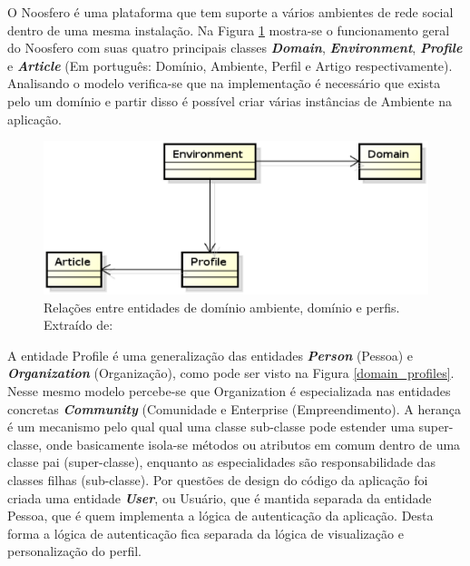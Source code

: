 
O Noosfero é uma plataforma que tem suporte a vários ambientes de rede social dentro de uma mesma instalação. Na Figura \ref{domain_main} mostra-se o funcionamento geral do Noosfero com suas quatro principais classes \textbf{\textit{Domain}}, \textbf{\textit{Environment}}, \textbf{\textit{Profile}} e \textbf{\textit{Article}} (Em português: Domínio, Ambiente, Perfil e Artigo respectivamente). Analisando o modelo verifica-se que na implementação é necessário que exista pelo um domínio e partir disso é possível criar várias instâncias de Ambiente na aplicação.

\begin{figure}[h]
    \centering
    \includegraphics[keepaspectratio=true,scale=0.65]
      {figuras/domain_main.eps}
    \caption{Relações entre entidades de domínio ambiente, domínio e perfis. Extraído de: \cite{bucher2013rede}}
    \label{domain_main}
\end{figure}

A entidade Profile é uma generalização das entidades \textbf{\textit{Person}} (Pessoa) e \textbf{\textit{Organization}} (Organização), como pode ser visto na Figura \ref{domain_profiles}. Nesse mesmo modelo percebe-se que Organization é especializada nas entidades concretas \textbf{\textit{Community}} (Comunidade e Enterprise (Empreendimento). A herança é um mecanismo pelo qual qual uma classe sub-classe pode estender uma super-classe, onde basicamente isola-se métodos ou atributos em comum dentro de uma classe pai (super-classe), enquanto as especialidades são responsabilidade das classes filhas (sub-classe).
Por questões de design do código da aplicação foi criada uma entidade \textbf{\textit{User}}, ou Usuário, que é mantida separada da entidade Pessoa, que é quem implementa a lógica de autenticação da aplicação. Desta forma a lógica de autenticação fica separada da lógica de visualização e personalização do perfil.


